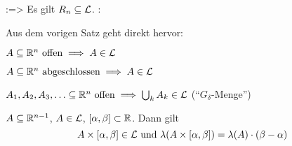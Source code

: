 \theorem:=>{
  Es gilt $R_{n}\subseteq\mathcal{L}$.
  }
\remark:{
  Aus dem vorigen Satz geht direkt hervor:
  \begin{stmts}
    \item $A\subseteq\mathbb R^n \text{ offen} \implies A\in\mathcal{L}$
    \item $A\subseteq\mathbb R^n \text{ abgeschlossen} \implies A\in\mathcal{L}$
    \item $A_1,A_2,A_3,\ldots \subseteq\mathbb R^n \text{ offen} \implies 
      \bigcup_k A_k\in\mathcal{L}$ (``$G_\delta$-Menge'')
    \item $A\subseteq\mathbb R^{n-1}$, $A\in\mathcal{L}$, $[\alpha,\beta]\subset\mathbb R$.
      Dann gilt
      \[A\times[\alpha,\beta]\in\mathcal{L} \text{ und } 
        \lambda(A\times[\alpha,\beta])=\lambda(A)\cdot(\beta-\alpha)
        \]
    \end{stmts}
  }
